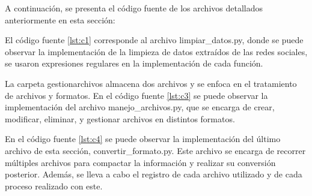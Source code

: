 A continuación, se presenta el código fuente de los archivos detallados anteriormente en esta sección:



El código fuente \ref{lst:c1} corresponde al archivo limpiar\_datos.py, donde se puede observar la implementación de la limpieza de datos extraídos de las redes sociales, se usaron expresiones regulares en la implementación de cada función. 




La carpeta gestionarchivos almacena dos archivos y se enfoca en el tratamiento de archivos y formatos. En el código fuente \ref{lst:c3} se puede observar la implementación del archivo manejo\_archivos.py, que se encarga de crear, modificar, eliminar, y gestionar archivos en distintos formatos.



En el código fuente \ref{lst:c4} se puede observar la implementación del último archivo de esta sección, convertir\_formato.py. Este archivo se encarga de recorrer múltiples archivos para compactar la información y realizar su conversión posterior. Además, se lleva a cabo el registro de cada archivo utilizado y de cada proceso realizado con este.

